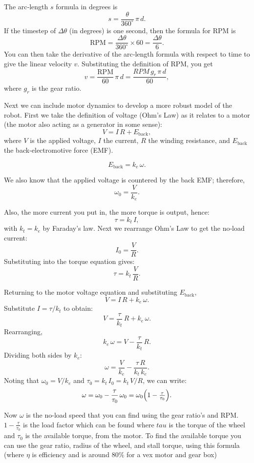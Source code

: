 \documentclass[11pt]{article}
\begin{document}
The arc‑length \(s\) formula in degrees is
\[
  s = \frac{\theta}{360^\circ}\,\pi\,d.
\]
If the timestep of \(\Delta\theta\) (in degrees) is one second, then the formula for RPM is
\[
  \mathrm{RPM}
  = \frac{\Delta\theta}{360^\circ}\times 60
  = \frac{\Delta\theta}{6}.
\]
You can then take the derivative of the arc‑length formula with respect to time to give the linear velocity \(v\).  Substituting the definition of RPM, you get
\[
  v = \frac{\mathrm{RPM}}{60}\,\pi\,d
  = \frac{RPM\,g_r\,\pi\,d}{60},
\]
where \(g_r\) is the gear ratio.

Next we can include motor dynamics to develop a more robust model of the robot.  First we take the definition of voltage (Ohm's Law) as it relates to a motor (the motor also acting as a generator in some sense):
\[
  V = I\,R + E_{\mathrm{back}},
\]
where \(V\) is the applied voltage, \(I\) the current, \(R\) the winding resistance, and \(E_{\mathrm{back}}\) the back‑electromotive force (EMF).

\[
  E_{\mathrm{back}} = k_{e}\,\omega.
\]

We also know that the applied voltage is countered by the back EMF; therefore,
\[
  \omega_{0} = \frac{V}{k_{e}}.
\]

Also, the more current you put in, the more torque is output, hence:
\[
  \tau = k_{t}\,I,
\]
with \(k_{t}=k_{e}\) by Faraday's law.  Next we rearrange Ohm's Law to get the no‑load current:
\[
  I_{0} = \frac{V}{R}.
\]
Substituting into the torque equation gives:
\[
  \tau = k_{t}\,\frac{V}{R}.
\]

Returning to the motor voltage equation and substituting \(E_{\mathrm{back}}\),
\[
  V = I\,R + k_{e}\,\omega.
\]
Substitute \(I = \tau/k_{t}\) to obtain:
\[
  V = \frac{\tau}{k_{t}}\,R + k_{e}\,\omega.
\]
Rearranging,
\[
  k_{e}\,\omega = V - \frac{\tau}{k_{t}}\,R.
\]
Dividing both sides by \(k_{e}\):
\[
  \omega = \frac{V}{k_{e}} - \frac{\tau\,R}{k_{t}\,k_{e}}.
\]
Noting that \(\omega_{0} = V/k_{e}\) and \(\tau_{0} = k_{t}\,I_{0} = k_{t}\,V/R\), we can write:
\[
  \omega = \omega_{0} - \frac{\tau}{\tau_{0}}\,\omega_{0}
  = \omega_{0}\Bigl(1 - \tfrac{\tau}{\tau_{0}}\Bigr).
\]

Now \(\omega\) is the no-load speed that you can find using the gear ratio's and RPM. \(1 - \tfrac{\tau}{\tau_{0}}\) is the load factor which can be found where \(tau\) is the torque of the wheel and \(\tau_{0}\) is the available torque, from the motor. To find the available torque you can use the gear ratio, radius of the wheel, and stall torque, using this formula (where \(\eta\) is efficiency and is around 80\% for a vex motor and gear box)
\end{document}
